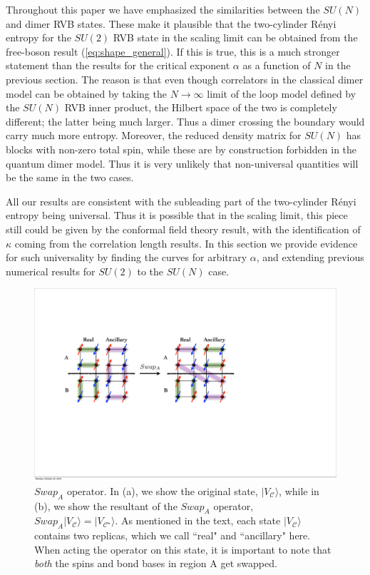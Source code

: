 \documentclass[11pt]{iopart}
\begin{document}
Throughout this paper we have emphasized the similarities between the $SU(N)$ and dimer RVB states. These make it plausible that the two-cylinder R\'enyi entropy for the $SU(2)$ RVB state in the scaling limit can be obtained from the free-boson result (\ref{eq:shape_general}). If this is true, this is a much stronger statement than the results for the critical exponent $\alpha$ as a function of $N$ in the previous section. The reason is that even though correlators in the classical dimer model can be obtained by taking the $N\to\infty$ limit of the loop model defined by the $SU(N)$ RVB inner product, the Hilbert space of the two is completely different; the latter being much larger. Thus a dimer crossing the boundary would carry much more entropy. Moreover, the reduced density matrix for $SU(N)$ has blocks with non-zero total spin, while these are by construction forbidden in the quantum dimer model. Thus it is very unlikely that non-universal quantities will be the same in the two cases. 


All our results are consistent with the subleading part of the two-cylinder R\'enyi entropy being universal. Thus it is possible that in the scaling limit, this piece still could be given by the conformal field theory result, with the identification of $\kappa$ coming from the correlation length results. In this section we provide evidence for such universality by finding the curves for arbitrary $\alpha$, and extending previous numerical results \cite{Ju2012} for $SU(2)$ to the $SU(N)$ case.

\begin{figure}[t]
 \begin{center}
  \includegraphics[scale=0.4]{./figures/swapA.pdf}
 \end{center}
\caption{$Swap_A$ operator. In (a), we show the original state, $|V_{\mathcal C} \rangle$, while in (b), we show the resultant of the $Swap_A$ operator, $Swap_A |V_{\mathcal C} \rangle =  |V_{\mathcal C^{\star}} \rangle$. As mentioned in the text, each state $|V_{\mathcal C} \rangle$ contains two replicas, which we call ``real" and ``ancillary" here. When acting the operator on this state, it is important to note that {\it both} the spins and bond bases in region A get swapped.}
\label{fig:swap}
\end{figure}
\end{document}
